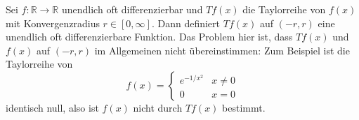 \documentclass[../main.tex]{subfiles}
\begin{document}
\begin{example}
  Sei $f \colon \mathbb{R} \to \mathbb{R}$ unendlich oft differenzierbar und
  $Tf(x)$ die Taylorreihe von $f(x)$ mit Konvergenzradius $r \in [0, \infty]$.
  Dann definiert $Tf(x)$ auf $(-r, r)$ eine unendlich oft differenzierbare Funktion.
  Das Problem hier ist, dass $Tf(x) $ und $f(x)$ auf $(-r, r)$ im Allgemeinen
  nicht übereinstimmen:
  Zum Beispiel ist die Taylorreihe von
  \[
    f(x) =
    \begin{cases}
      e^{-1/x^2} & x \neq 0\\
      0 & x = 0
    \end{cases}
  \]
  identisch null, also ist $f(x)$ nicht durch $Tf(x)$ bestimmt.
\end{example}
\end{document}
